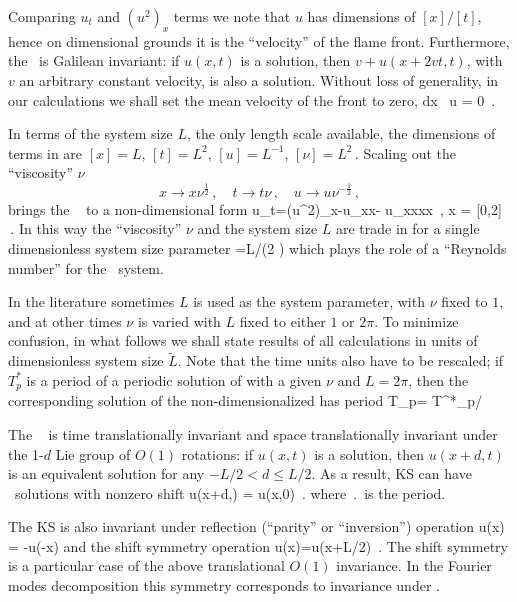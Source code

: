 Comparing $u_t$ and $(u^2)_x$ terms we note that $u$ has
dimensions of $[x]/[t]$, hence on dimensional grounds
it is the ``velocity'' of the flame front. 
Furthermore, the  \KSe\ is
Galilean invariant: if $u(x,t)$ is a solution, then 
$v+u(x+2vt,t)$, with $v$ an arbitrary constant velocity, is also a solution. 
Without loss of generality, in our calculations we shall set 
the mean velocity of the  front to zero,
\beq
\int dx \, u = 0
\,.

In terms of the system size $L$, the only length scale available,
the dimensions of terms in  are
$ %
[x]=L
$, $%
[t]=L^2
$, $%
[u]=L^{-1}
$, $%
[\nu]=L^2
\,.
$ %
 Scaling out the ``viscosity'' $\nu$ 
\[ 
x \to x \nu^{\frac{1}{2}}
\,,\quad
t \to t \nu
\,,\quad
u \to u \nu^{-\frac{1}{2}}
\,,
\]
brings the \KSe\ 
to a non-dimensional form
\beq
u_t=(u^2)_x-u_{xx}- u_{xxxx}
\,,\qquad	
	x \in  [0,L\nu^{-\frac{1}{2}}] = [0,2\pi{}]
\,.
In this way the ``viscosity'' $\nu$
and the system size $L$ are trade in for a single
dimensionless system size parameter
\beq
	={L}/{(2 \pi \sqrt{\nu})}
which plays the role of a ``Reynolds number''
for the \KS\ system.

In the literature sometimes 
$L$ is used as the system parameter, with $\nu$ fixed to $1$, and
at other times $\nu$ is varied with $L$ fixed to either $1$ or $2\pi$.
To minimize confusion,
in what follows we shall state results of all 
calculations in units of dimensionless system size $\tilde{L}$.
Note that the time units also have to be
rescaled; if $T^*_p$ is a period
of a periodic solution of  with a given
$\nu$ and $L=2\pi$, then
the corresponding solution of the non-dimensionalized 
has period 
\beq
 T_p= T^*_p/\nu
{}

The \KSe\   is
time translationally invariant
and 
space translationally invariant
under the 1-$d$ Lie group of $O(1)$ rotations: if
$u(x,t)$ is a solution, then $u(x+d,t)$ is an equivalent
solution for any $-L/2 < d \leq L/2$.
As a result,
KS can have \rpo\ solutions with nonzero shift
\beq
u(x+d,\period{}) = u(x,0)
\,.
where $\period{}$ is the period. 

The KS is also invariant under
reflection (``parity'' or ``inversion'') operation
\beq
{} u(x) = -u(-x)
and the shift symmetry operation 
\beq
{} u(x)=u(x+L/2)
\,. 
The shift symmetry is a particular case of the
above translational $O(1)$ invariance.
In the Fourier modes decomposition  this
symmetry corresponds to invariance under
.

